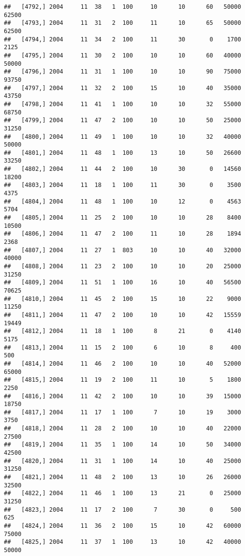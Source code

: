 \documentclass{article}\usepackage[]{graphicx}\usepackage[]{color}
\makeatletter
\newenvironment{kframe}{%
 \def\at@end@of@kframe{}%
 \ifinner\ifhmode%
  \def\at@end@of@kframe{\end{minipage}}%
  \begin{minipage}{\columnwidth}%
 \fi\fi%
 \def\FrameCommand##1{\hskip\@totalleftmargin \hskip-\fboxsep
 \colorbox{shadecolor}{##1}\hskip-\fboxsep
     \hskip-\linewidth \hskip-\@totalleftmargin \hskip\columnwidth}%
 \MakeFramed {\advance\hsize-\width
   \@totalleftmargin\z@ \linewidth\hsize
   \@setminipage}}%
 {\par\unskip\endMakeFramed%
 \at@end@of@kframe}
\newenvironment{knitrout}{}{} %
\makeatother
\begin{document}
\begin{knitrout}
\begin{kframe}
\begin{verbatim}
##   [4792,] 2004     11  38   1  100     10      10      60   50000   62500
##   [4793,] 2004     11  31   2  100     11      10      65   50000   62500
##   [4794,] 2004     11  34   2  100     11      30       0    1700    2125
##   [4795,] 2004     11  30   2  100     10      10      60   40000   50000
##   [4796,] 2004     11  31   1  100     10      10      90   75000   93750
##   [4797,] 2004     11  32   2  100     15      10      40   35000   43750
##   [4798,] 2004     11  41   1  100     10      10      32   55000   68750
##   [4799,] 2004     11  47   2  100     10      10      50   25000   31250
##   [4800,] 2004     11  49   1  100     10      10      32   40000   50000
##   [4801,] 2004     11  48   1  100     13      10      50   26600   33250
##   [4802,] 2004     11  44   2  100     10      30       0   14560   18200
##   [4803,] 2004     11  18   1  100     11      30       0    3500    4375
##   [4804,] 2004     11  48   1  100     10      12       0    4563    5704
##   [4805,] 2004     11  25   2  100     10      10      28    8400   10500
##   [4806,] 2004     11  47   2  100     11      10      28    1894    2368
##   [4807,] 2004     11  27   1  803     10      10      40   32000   40000
##   [4808,] 2004     11  23   2  100     10      10      20   25000   31250
##   [4809,] 2004     11  51   1  100     16      10      40   56500   70625
##   [4810,] 2004     11  45   2  100     15      10      22    9000   11250
##   [4811,] 2004     11  47   2  100     10      10      42   15559   19449
##   [4812,] 2004     11  18   1  100      8      21       0    4140    5175
##   [4813,] 2004     11  15   2  100      6      10       8     400     500
##   [4814,] 2004     11  46   2  100     10      10      40   52000   65000
##   [4815,] 2004     11  19   2  100     11      10       5    1800    2250
##   [4816,] 2004     11  42   2  100     10      10      39   15000   18750
##   [4817,] 2004     11  17   1  100      7      10      19    3000    3750
##   [4818,] 2004     11  28   2  100     10      10      40   22000   27500
##   [4819,] 2004     11  35   1  100     14      10      50   34000   42500
##   [4820,] 2004     11  31   1  100     14      10      40   25000   31250
##   [4821,] 2004     11  48   2  100     13      10      26   26000   32500
##   [4822,] 2004     11  46   1  100     13      21       0   25000   31250
##   [4823,] 2004     11  17   2  100      7      30       0     500     625
##   [4824,] 2004     11  36   2  100     15      10      42   60000   75000
##   [4825,] 2004     11  37   1  100     13      10      42   40000   50000

\end{verbatim}
\end{kframe}
\end{knitrout}
\end{document}
